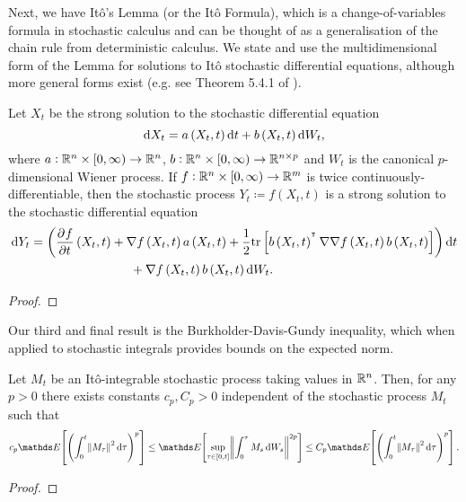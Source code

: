Next, we have It\^o's Lemma (or the It\^o Formula), which is a change-of-variables formula in stochastic calculus and can be thought of as a generalisation of the chain rule from deterministic calculus.
We state and use the multidimensional form of the Lemma for solutions to It\^o stochastic differential equations, although more general forms exist (e.g. see Theorem 5.4.1 of \cite{KallianpurSundar_2014_StochasticAnalysisDiffusion}).
\begin{theorem}[It\^o's Lemma]
	Let \(X_t\) be the strong solution to the stochastic differential equation
	\[
		\dif X_t = a\left(X_t, t\right)\dif t + b\left(X_t, t\right)\dif W_t,
	\]
	where \(a: \mathbb{R}^n \times [0,\infty) \to \mathbb{R}^n\), \(b: \mathbb{R}^n \times [0,\infty) \to \mathbb{R}^{n\times p}\) and \(W_t\) is the canonical \(p\)-dimensional Wiener process.
	If \(f: \mathbb{R}^n \times [0, \infty) \to \mathbb{R}^m\) is twice continuously-differentiable, then the stochastic process \(Y_t \coloneqq f\left(X_t, t\right)\) is a strong solution to the stochastic differential equation
	\begin{align*}
		\dif Y_t & = \left(\dpd{f}{t}\left(X_t, t\right) + \nabla f\left(X_t, t\right) a\left(X_t, t\right) + \frac12\mathrm{tr}\left[b\left(X_t, t\right)^{\T} \nabla\nabla f\left(X_t, t\right) b\left(X_t, t\right)\right] \right)\dif t \\
		         & \qquad\qquad\qquad\qquad + \nabla f\left(X_t, t\right)b\left(X_t, t\right) \dif W_t.
	\end{align*}
\end{theorem}
\begin{proof}

\end{proof}

Our third and final result is the Burkholder-Davis-Gundy inequality, which when applied to stochastic integrals provides bounds on the expected norm.
\begin{theorem}
	Let \(M_t\) be an It\^o-integrable stochastic process taking values in \(\mathbb{R}^n\).
	Then, for any \(p > 0\) there exists constants \(c_p, C_p > 0\) independent of the stochastic process \(M_t\) such that
	\[
		c_p\avg{\left(\int_0^t{\norm{M_\tau}^2\dif \tau}\right)^p} \leq \avg{\sup_{\tau \in \left[0, t\right]}\norm{\int_0^\tau{M_s\dif W_s}}^{2p}} \leq C_p\avg{\left(\int_0^t{\norm{M_\tau}^2\dif \tau}\right)^p}.
	\]
\end{theorem}
\begin{proof}

\end{proof}



